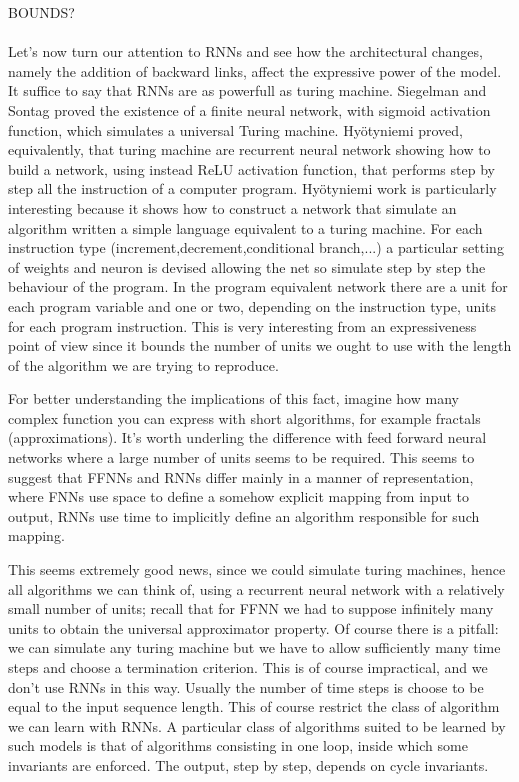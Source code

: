 BOUNDS?
\\\\Let's now turn our attention to RNNs and see how the architectural changes, namely the addition of backward links, affect the expressive power of the model.
It suffice to say that RNNs are as powerfull as turing machine. Siegelman and Sontag \cite{Siegelmann91turingcomputability} proved the existence 
of a finite neural network, with sigmoid activation function, which simulates a universal Turing machine. Hy{\"o}tyniemi \cite{Hyotyniemi96turingmachines} proved, equivalently,
that turing machine are recurrent neural network showing how to build a network, using instead ReLU activation function, that performs step by step 
all the instruction of a computer program.
Hy{\"o}tyniemi work is particularly interesting because it shows how to construct a network that simulate an algorithm written a simple language equivalent to a turing machine.
For each instruction type (increment,decrement,conditional branch,...) a particular setting of weights and neuron is devised allowing the net so simulate step by step the behaviour of the program. 
In the program equivalent network there are a unit for each program variable and one or two, depending on the instruction type, units for each program instruction.
This is very interesting from an expressiveness point of view since it bounds the number of units we ought to use with the length of the algorithm we are trying to reproduce.

For better understanding the implications of this fact, imagine how many complex function you can express with short algorithms, for example fractals (approximations).
It's worth underling the difference with feed forward neural networks where a large number of units seems to be required. This seems to suggest that FFNNs and RNNs differ mainly in a manner of 
representation, where FNNs use space to define a somehow explicit mapping from input to output, RNNs use time to implicitly define an algorithm responsible for such mapping. 

This seems extremely good news, since we could simulate turing machines, hence all algorithms we can think of, using a recurrent neural network with a relatively small number of units; 
recall that for FFNN we had to suppose infinitely many units to obtain the universal approximator property.
Of course there is a pitfall: we can simulate any turing machine but we have to allow sufficiently many time steps and choose a termination criterion.
This is of course impractical, and we don't use RNNs in this way. Usually the number of time steps is choose to be equal to the input sequence length. This of course restrict the class of algorithm
we can learn with RNNs. A particular class of algorithms suited to be learned by such models is that of algorithms consisting in one loop, inside which some invariants are enforced. The output, step by step,
depends on cycle invariants.





